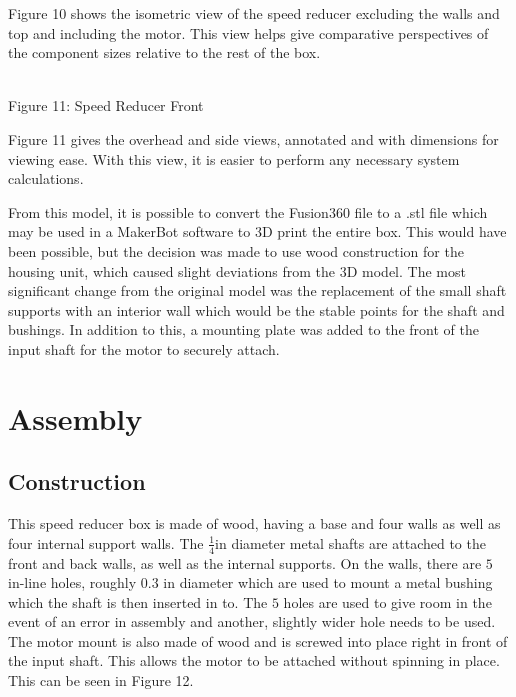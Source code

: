 \documentclass{article}
\begin{document}
Figure 10 shows the isometric view of the speed reducer excluding the walls and top and including the motor. This view helps give comparative perspectives of the component sizes relative to the rest of the box.

\begin{center}
\\
\scriptsize{
Figure 11: Speed Reducer Front
}
\end{center}

Figure 11 gives the overhead and side views, annotated and with dimensions for viewing ease. With this view, it is easier to perform any necessary system calculations.

From this model, it is possible to convert the Fusion360 file to a .stl file which may be used in a MakerBot software to 3D print the entire box. This would have been possible, but the decision was made to use wood construction for the housing unit, which caused slight deviations from the 3D model. The most significant change from the original model was the replacement of the small shaft supports with an interior wall which would be the stable points for the shaft and bushings. In addition to this, a mounting plate was added to the front of the input shaft for the motor to securely attach.

\section{Assembly}
\subsection{Construction}
This speed reducer box is made of wood, having a base and four walls as well as four internal support walls. The $\frac{1}{4}$in diameter metal shafts are attached to the front and back walls, as well as the internal supports. On the walls, there are $5$ in-line holes, roughly $0.3$ in diameter which are used to mount a metal bushing which the shaft is then inserted in to. The $5$ holes are used to give room in the event of an error in assembly and another, slightly wider hole needs to be used. The motor mount is also made of wood and is screwed into place right in front of the input shaft. This allows the motor to be attached without spinning in place. This can be seen in Figure 12.
\end{document}
